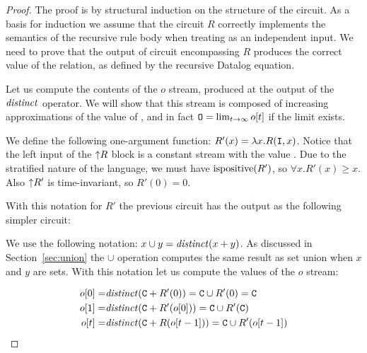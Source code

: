 \begin{proof}
The proof is by structural induction on the structure of the circuit.
As a basis for induction we assume that the circuit $R$ correctly implements
the semantics of the recursive rule body when treating  as an 
independent input.  We need to prove that the output of circuit encompassing
$R$ produces the correct value of the  relation, as defined by
the recursive Datalog equation.

Let us compute the contents of the $o$ stream, produced at the output
of the $\mathit{distinct}$ operator.  We will show that this stream is composed
of increasing approximations of the value of , and in fact
$\mbox{\texttt{O}} = \lim_{t \to \infty} o[t]$ if the limit exists.

We define the following one-argument function: $R'(x) = \lambda x . R(\mbox{\texttt{I}}, x)$.
Notice that the left input of the ${\uparrow}R$ block is a constant stream
with the value .  Due to the stratified nature of the language,
we must have $\mbox{ispositive}(R')$, so $\forall x . R'(x) \geq x$.
Also ${\uparrow}R'$ is time-invariant, so $R'(0) = 0$.

With this notation for $R'$ the previous circuit has the 
output as the following simpler circuit:

\begin{center}
\end{center}

We use the following notation: $x \cup y = \mathit{distinct}(x + y)$.  As discussed in Section~\ref{sec:union}
the $\cup$ operation computes the same result as set union when $x$ and $y$ are sets.
With this notation let us compute the values of the $o$ stream:

$$
\begin{aligned}
o[0] =& \mathit{distinct}(\mbox{\texttt{C}} + R'(0)) = \mbox{\texttt{C}} \cup R'(0) = \mbox{\texttt{C}} \\
o[1] =& \mathit{distinct}(\mbox{\texttt{C}} + R'(o[0])) = \mbox{\texttt{C}} \cup R'(\mbox{\texttt{C}}) \\
o[t] =& \mathit{distinct}(\mbox{\texttt{C}} + R(o[t-1])) = \mbox{\texttt{C}} \cup R'(o[t-1]) \\
\end{aligned}
$$ 


\end{proof}
